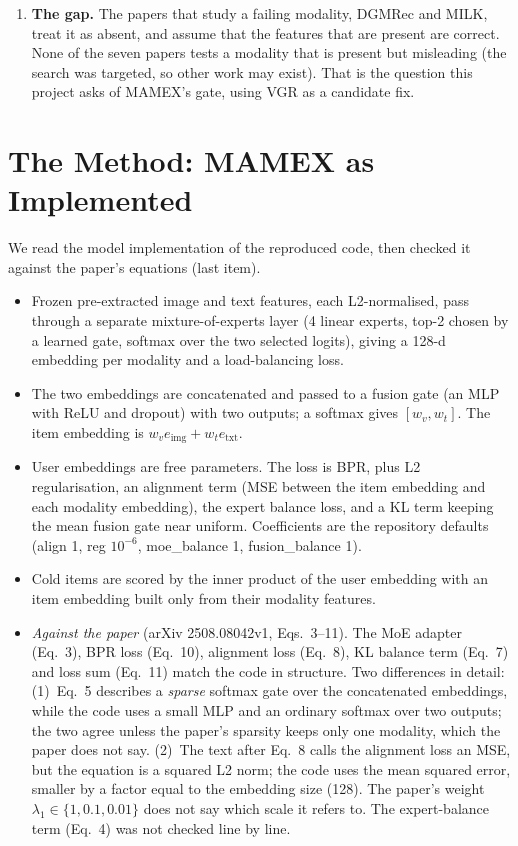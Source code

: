 \documentclass[conference]{IEEEtran}
\begin{document}
\begin{enumerate}
\item \textbf{The gap.} The papers that study a failing modality, DGMRec and MILK, treat it as absent, and assume that the features that are present are correct. None of the seven papers tests a modality that is present but misleading (the search was targeted, so other work may exist). That is the question this project asks of MAMEX's gate, using VGR as a candidate fix.
\end{enumerate}

\section{The Method: MAMEX as Implemented}

We read the model implementation of the reproduced code, then checked it against the paper's equations (last item).
\begin{itemize}
\item Frozen pre-extracted image and text features, each L2-normalised, pass through a separate mixture-of-experts layer (4 linear experts, top-2 chosen by a learned gate, softmax over the two selected logits), giving a 128-d embedding per modality and a load-balancing loss.
\item The two embeddings are concatenated and passed to a fusion gate (an MLP with ReLU and dropout) with two outputs; a softmax gives $[w_v, w_t]$. The item embedding is $w_v e_{\text{img}} + w_t e_{\text{txt}}$.
\item User embeddings are free parameters. The loss is BPR, plus L2 regularisation, an alignment term (MSE between the item embedding and each modality embedding), the expert balance loss, and a KL term keeping the mean fusion gate near uniform. Coefficients are the repository defaults (align 1, reg $10^{-6}$, moe\_balance 1, fusion\_balance 1).
\item Cold items are scored by the inner product of the user embedding with an item embedding built only from their modality features.
\item \emph{Against the paper} (arXiv 2508.08042v1, Eqs.~3--11). The MoE adapter (Eq.~3), BPR loss (Eq.~10), alignment loss (Eq.~8), KL balance term (Eq.~7) and loss sum (Eq.~11) match the code in structure. Two differences in detail: (1)~Eq.~5 describes a \emph{sparse} softmax gate over the concatenated embeddings, while the code uses a small MLP and an ordinary softmax over two outputs; the two agree unless the paper's sparsity keeps only one modality, which the paper does not say. (2)~The text after Eq.~8 calls the alignment loss an MSE, but the equation is a squared L2 norm; the code uses the mean squared error, smaller by a factor equal to the embedding size (128). The paper's weight $\lambda_1 \in \{1, 0.1, 0.01\}$ does not say which scale it refers to. The expert-balance term (Eq.~4) was not checked line by line.
\end{itemize}
\end{document}
